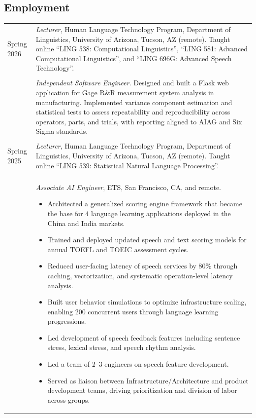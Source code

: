 \subsection*{Employment}
\noindent
\begin{longtable}{p{} p{}}
	Spring 2026 & \textit{Lecturer}, Human Language Technology Program, Department of Linguistics, University of Arizona, Tucson, AZ (remote). Taught online ``LING 538: Computational Linguistics'', ``LING 581: Advanced Computational Linguistics'', and ``LING 696G: Advanced Speech Technology''. \\ \\
	\daterange{May 2025}{present} & \textit{Independent Software Engineer}. Designed and built a Flask web application for Gage R\&R measurement system analysis in manufacturing. Implemented variance component estimation and statistical tests to assess repeatability and reproducibility across operators, parts, and trials, with reporting aligned to AIAG and Six Sigma standards. \\ \\
	Spring 2025 & \textit{Lecturer}, Human Language Technology Program, Department of Linguistics, University of Arizona, Tucson, AZ (remote). Taught online ``LING 539: Statistical Natural Language Processing''. \\ \\
	\daterange{2020}{2024} & \textit{Associate AI Engineer}, ETS, San Francisco, CA, and remote.
	\begin{itemize}
		\setlength\itemsep{0.3em}
		\item Architected a generalized scoring engine framework that became the base for 4 language learning applications deployed in the China and India markets.
		\item Trained and deployed updated speech and text scoring models for annual TOEFL and TOEIC assessment cycles.
		\item Reduced user-facing latency of speech services by 80\% through caching, vectorization, and systematic operation-level latency analysis.
		\item Built user behavior simulations to optimize infrastructure scaling, enabling 200 concurrent users through language learning progressions.
		\item Led development of speech feedback features including sentence stress, lexical stress, and speech rhythm analysis.
		\item Led a team of 2--3 engineers on speech feature development.
		\item Served as liaison between Infrastructure/Architecture and product development teams, driving prioritization and division of labor across groups.

\end{itemize}
\end{longtable}
